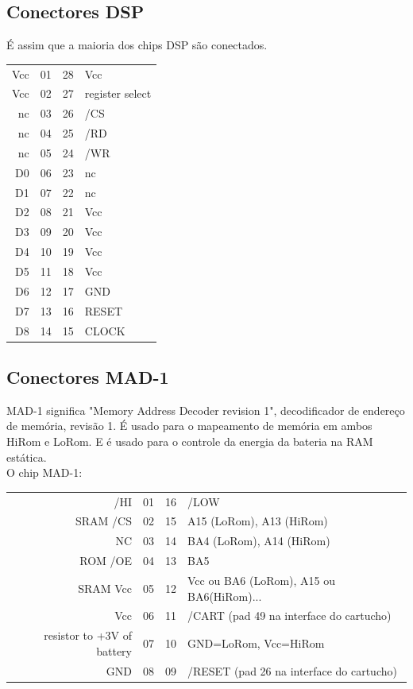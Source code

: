 \documentclass[paper=a4, fontsize=11pt]{scrartcl}	%
\numberwithin{equation}{section}															%
\numberwithin{figure}{section}																%
\numberwithin{table}{section}																%
\begin{document}
\subsection*{Conectores DSP}

É assim que a maioria dos chips DSP são conectados.\\

\begin{tabular}{rlrl}
               Vcc &  01  & 28  & Vcc\\
               Vcc &  02  & 27  & register select\\
                nc &  03  & 26  & /CS \\
                nc &  04  & 25  & /RD\\
                nc &  05  & 24  & /WR\\
                D0 &  06  & 23  & nc\\
                D1 &  07  & 22  & nc\\
                D2 &  08  & 21  & Vcc\\
                D3 &  09  & 20  & Vcc\\
                D4 &  10  & 19  & Vcc\\
                D5 &  11  & 18  & Vcc\\
                D6 &  12  & 17  & GND\\
                D7 &  13  & 16  & RESET\\
                D8 &  14  & 15  & CLOCK\\
\end{tabular}


\subsection*{Conectores MAD-1}

MAD-1 significa "Memory Address Decoder revision 1",  decodificador de endereço de memória, revisão 1. É usado para o mapeamento de memória em ambos HiRom e LoRom. E é usado para o controle da energia da bateria na RAM estática.\\

O chip MAD-1:\\
\begin{tabular}{rlrl}                
                                /HI & 01   &   16 & /LOW\\
                           SRAM /CS & 02   &   15 & A15 (LoRom), A13 (HiRom) \\
                                 NC & 03   &   14 & BA4 (LoRom), A14 (HiRom) \\
                            ROM /OE & 04   &   13 & BA5 \\
                           SRAM Vcc & 05   &   12 & Vcc ou BA6 (LoRom), A15 ou BA6(HiRom)... \\
                                Vcc & 06   &   11 & /CART (pad 49 na interface do cartucho) \\
         resistor to +3V of battery & 07   &   10 & GND=LoRom, Vcc=HiRom \\
                                GND & 08   &   09 & /RESET (pad 26 na interface do cartucho) \\
\end{tabular}
 
\end{document}
